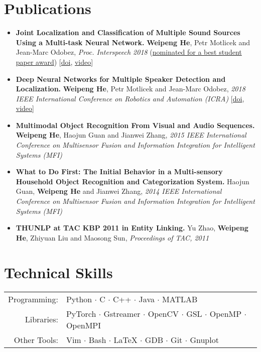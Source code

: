 \documentclass[a4paper,11pt]{article} %
\begin{document}
\section{Publications}
\begin{itemize}
  \item \textbf{Joint Localization and Classification of Multiple Sound Sources Using a Multi-task Neural Network.}
    \textbf{Weipeng He}, Petr Motlicek and Jean-Marc Odobez,
    \textit{Proc. Interspeech 2018}
    (\underline{nominated for a best student paper award})
    [\href{http://doi.org/10.21437/Interspeech.2018-1269}{doi}, \href{https://www.youtube.com/watch?v=O7bQvg03RTc}{video}]

  \item \textbf{Deep Neural Networks for Multiple Speaker Detection and Localization.}
    \textbf{Weipeng He}, Petr Motlicek and Jean-Marc Odobez,
    \textit{2018 IEEE International Conference on Robotics and Automation (ICRA)}
    [\href{http://doi.org/10.1109/ICRA.2018.8461267}{doi}, \href{https://www.youtube.com/watch?v=_4EwuVlE_pU}{video}]

  \item \textbf{Multimodal Object Recognition From Visual and Audio Sequences.}
    \textbf{Weipeng He}, Haojun Guan and Jianwei Zhang,
    \textit{2015 IEEE International Conference on Multisensor Fusion and Information Integration for Intelligent Systems (MFI)}

  \item \textbf{What to Do First: The Initial Behavior in a Multi-sensory Household Object Recognition and Categorization System.}
    Haojun Guan, \textbf{Weipeng He} and Jianwei Zhang,
    \textit{2014 IEEE International Conference on Multisensor Fusion and Information Integration for Intelligent Systems (MFI)}

  \item \textbf{THUNLP at TAC KBP 2011 in Entity Linking.}
    Yu Zhao, \textbf{Weipeng He}, Zhiyuan Liu and Maosong Sun,
    \textit{Proceedings of TAC, 2011}
\end{itemize}


\section{Technical Skills}

\begin{tabular}{rl}
  Programming: & Python $\cdotp$ C $\cdotp$ C++ $\cdotp$ Java $\cdotp$ MATLAB \\
  Libraries: & PyTorch $\cdotp$ Gstreamer $\cdotp$ OpenCV $\cdotp$ GSL $\cdotp$ OpenMP $\cdotp$ OpenMPI \\
  Other Tools: & Vim $\cdotp$ Bash $\cdotp$ \LaTeX{} $\cdotp$ GDB $\cdotp$ Git $\cdotp$ Gnuplot \\
\end{tabular}
\end{document}
